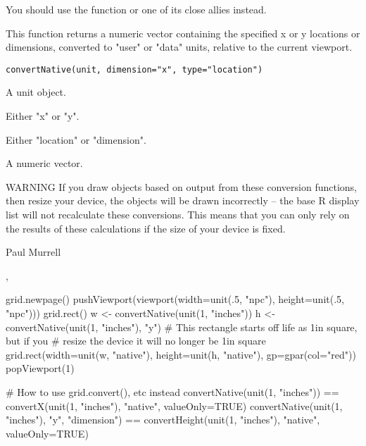 %
\begin{Description}\relax
{}

You should use the  function or one of its
close allies instead.

This function returns a numeric vector containing the specified
x or y locations or dimensions, converted to "user" or "data"
units, relative to the current viewport.
\end{Description}
%
\begin{Usage}
\begin{verbatim}
convertNative(unit, dimension="x", type="location")
\end{verbatim}
\end{Usage}
%
\begin{Arguments}
\begin{ldescription}
\item[\code{unit}]  A unit object. 
\item[\code{dimension}]  Either "x" or "y". 
\item[\code{type}]  Either "location" or "dimension". 
\end{ldescription}
\end{Arguments}
%
\begin{Value}
A numeric vector.
\end{Value}
%
\begin{Section}{WARNING }
 If you draw objects based on output from these conversion
functions, then resize your device, the objects will be drawn 
incorrectly -- the base R display list will not recalculate these
conversions.  This means that you can only rely on the results of 
these calculations if the size of your device is fixed.
\end{Section}
%
\begin{Author}\relax
 Paul Murrell 
\end{Author}
%
\begin{SeeAlso}\relax
 ,  
\end{SeeAlso}
%
\begin{Examples}
\begin{ExampleCode}
grid.newpage()
pushViewport(viewport(width=unit(.5, "npc"),
                       height=unit(.5, "npc")))
grid.rect()
w <- convertNative(unit(1, "inches"))
h <- convertNative(unit(1, "inches"), "y")
# This rectangle starts off life as 1in square, but if you
# resize the device it will no longer be 1in square
grid.rect(width=unit(w, "native"), height=unit(h, "native"),
          gp=gpar(col="red"))
popViewport(1)

# How to use grid.convert(), etc instead
convertNative(unit(1, "inches")) ==
  convertX(unit(1, "inches"), "native", valueOnly=TRUE)
convertNative(unit(1, "inches"), "y", "dimension") ==
  convertHeight(unit(1, "inches"), "native", valueOnly=TRUE)
\end{ExampleCode}
\end{Examples}
